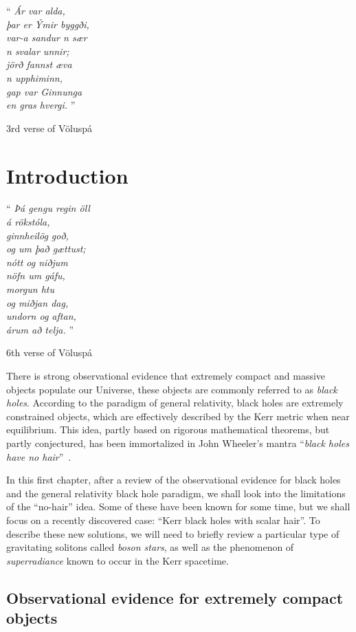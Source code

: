 \thispagestyle{empty}
\epigraph{ 
``\emph{
Ár var alda, \\
þar er Ýmir byggði, \\
var-a sandur n sær \\
n svalar unnir; \\
jörð fannst æva \\
n upphiminn, \\
gap var Ginnunga \\
en gras hvergi.}
''}{3rd verse of Völuspá}
\chapter{Introduction}
\label{ch:intro}

\epigraph{``\emph{
Þá gengu regin öll \\
á rökstóla, \\
ginnheilög goð, \\
og um það gættust; \\
nótt og niðjum \\
nöfn um gáfu, \\ 
morgun htu \\
og miðjan dag, \\
undorn og aftan, \\
árum að telja.} 
''}{6th verse of Völuspá}


There is strong observational evidence that extremely compact and massive objects populate our Universe, these objects are commonly referred to as \textit{black holes}.
According to the paradigm of general relativity, black holes are extremely constrained objects, which are effectively described by the Kerr metric when near equilibrium.
This idea, partly based on rigorous mathematical theorems, but partly conjectured, has been immortalized in John Wheeler's mantra ``\textit{black holes have no hair}''~\cite{Misner:1974qy}. 


In this first chapter, after a review of the observational evidence for black holes and the general relativity black hole paradigm, we shall look into the limitations of the ``no-hair'' idea.
Some of these have been known for some time, but we shall focus on a recently discovered case: ``Kerr black holes with scalar hair''.
To describe these new solutions, we will need to briefly review a particular type of gravitating solitons called \textit{boson stars}, as well as the phenomenon of \textit{superradiance} known to occur in the Kerr spacetime.
   
\section{Observational evidence for extremely compact objects}

